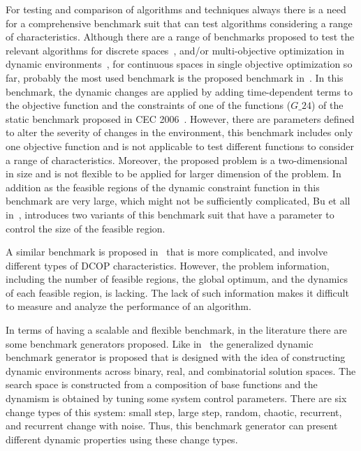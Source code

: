 \documentclass[review]{elsarticle}
\begin{document}
For testing and comparison of algorithms and techniques always there is a need for a comprehensive benchmark suit that can test algorithms considering a range of characteristics.
Although there are a range of benchmarks proposed to test the relevant algorithms for discrete spaces~\citep{woldesenbet2009dynamic}, and/or multi-objective optimization in dynamic environments~\citep{jiang2017evolutionary}, for continuous spaces in single objective optimization so far, probably the most used benchmark is the proposed benchmark in~\citep{Nguyen20121}. In this benchmark, the dynamic changes are applied by adding time-dependent terms to the objective function and the constraints of one of the functions ($G\_24$) of the static benchmark proposed in CEC 2006~\citep{liang2006problem}. However, there are parameters defined to alter the severity of changes in the environment, this benchmark includes only one objective function and is not applicable to test different functions to consider a range of characteristics. Moreover, the proposed problem is a two-dimensional in size and is not flexible to be applied for larger dimension of the problem.
In addition as the feasible regions of the dynamic constraint function in this benchmark are very large, which might not be sufficiently complicated, Bu et all in~\citep{bu2017continuous}, introduces two variants of this benchmark suit that have a parameter to control the size of the feasible region.

A similar benchmark is proposed in~\cite{zhang2014danger} that is more complicated, and involve different types of DCOP characteristics. However, the problem information, including the number of feasible regions, the global optimum, and the dynamics of each feasible region, is lacking. The lack of such information makes it difficult to measure and analyze the performance of an algorithm.

In terms of having a scalable and flexible benchmark, in the literature there are some benchmark generators proposed. Like in~\citep{li2008benchmark} the generalized dynamic benchmark generator is proposed that is designed with the idea of constructing dynamic environments across binary, real, and combinatorial solution spaces. The search space is constructed from a composition of base functions and the dynamism is obtained by tuning some system control parameters. There are six change types of this system: small step, large step, random, chaotic, recurrent, and recurrent change with noise. Thus, this benchmark generator can present different dynamic properties using these change types.
\end{document}
